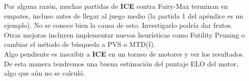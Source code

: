 \documentclass{article}
\newcommand{\ICE}[0]{{\bf ICE}}
\begin{document}
\begin{multicols}{2}
Por alguna razón, muchas partidas de \ICE{} contra Fairy-Max terminan
en empates, incluso antes de llegar al juego medio (la partida 1
del apéndice es un ejemplo). No se conoce bien la causa de esto.
Investigarlo podría dar frutos.
\\

Otras mejoras incluyen implementar nuevas heurísticas como Futility
Pruning o cambiar el método de búsqueda a PVS o MTD(f).
\\

Algo pendiente es inscribir a \ICE{} en un torneo de motores y ver los
resultados. De esta manera tendremos una buena estimación del puntaje
ELO del motor, algo que aún no se calculó.




\end{multicols}


\newcommand{\tie}[0]{\nicefrac{1}{2}-\nicefrac{1}{2}}
\newcommand{\game}[2]{
	\newchessgame
	\parbox{0.5\textwidth}{
	\begin{center}
	 #2 \\
	 \hidemoves{#1}
	 \chessboard[arrow=to,
		       smallboard,
		       lastmoveid,
		       showmover=false,
		       pgfstyle=straightmove,color=red,
		       markmove=\xskakget{movefrom}-\xskakget{moveto},
	 ]
	\end{center}
	}
}


\end{document}

